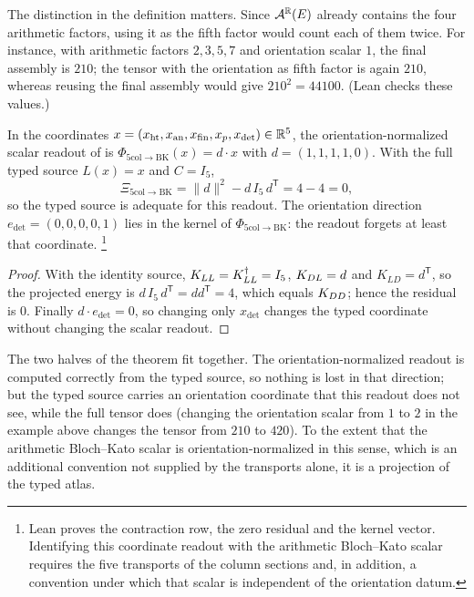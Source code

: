 The distinction in the definition matters.  Since $\mathcal A^{\mathbb{R}}(E)$
already contains the four arithmetic factors, using it as the fifth factor
would count each of them twice.  For instance, with arithmetic factors
$2,3,5,7$ and orientation scalar $1$, the final assembly is $210$; the
tensor with the orientation as fifth factor is again $210$, whereas
reusing the final assembly would give $210^2=44100$.  (Lean checks these
values.)

\begin{theorem}\label{thm:apparatus:five-col-bk-comparison}
In the coordinates
$x=(x_{\mathrm{ht}},x_{\mathrm{an}},x_{\mathrm{fin}},x_p,x_{\det})\in\mathbb{R}^5$,
the orientation-normalized scalar readout of
 is
$\Phi_{\mathrm{5col}\to\mathrm{BK}}(x)=d\cdot x$ with $d=(1,1,1,1,0)$.
With the full typed source $L(x)=x$ and $C=I_5$,
\[
  \Xi_{\mathrm{5col}\to\mathrm{BK}}
  =
  \|d\|^2-d\,I_5\,d^{\mathsf T}
  =
  4-4=0,
\]
so the typed source is adequate for this readout.  The orientation
direction $e_{\det}=(0,0,0,0,1)$ lies in the kernel of
$\Phi_{\mathrm{5col}\to\mathrm{BK}}$: the readout forgets at least that
coordinate.%
\footnote{Lean proves the contraction row, the zero residual and the
kernel vector.  Identifying this coordinate readout with the arithmetic
Bloch--Kato scalar requires the five transports of the column sections
and, in addition, a convention under which that scalar is independent of
the orientation datum.}
\end{theorem}

\begin{proof}
With the identity source, $K_{LL}=K_{LL}^{\dagger}=I_5$, $K_{DL}=d$ and
$K_{LD}=d^{\mathsf T}$, so the projected energy is
$d\,I_5\,d^{\mathsf T}=dd^{\mathsf T}=4$, which equals $K_{DD}$; hence the
residual is $0$.  Finally $d\cdot e_{\det}=0$, so changing only
$x_{\det}$ changes the typed coordinate without changing the scalar
readout.
\end{proof}

The two halves of the theorem fit together.  The orientation-normalized
readout is computed correctly from the typed source, so nothing is lost
in that direction; but the typed source carries an orientation coordinate
that this readout does not see, while the full tensor does (changing the
orientation scalar from $1$ to $2$ in the example above changes the
tensor from $210$ to $420$).  To the extent that the arithmetic
Bloch--Kato scalar is orientation-normalized in this sense, which is an
additional convention not supplied by the transports alone, it is a
projection of the typed atlas.
